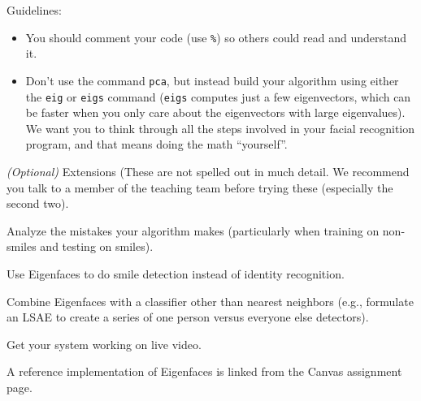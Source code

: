 \begin{prob}
Guidelines:
\begin{itemize}
\item You should comment your code (use \texttt{\%}) so others could read and understand it.
\item Don't use the command \texttt{pca}, but instead build your algorithm using either the \texttt{eig} or \texttt{eigs} command (\texttt{eigs} computes just a few eigenvectors, which can be faster when you only care about the eigenvectors with large eigenvalues). We want you to think through all the steps involved in your facial recognition program, and that means doing the math ``yourself''.
\end{itemize}
\emph{(Optional)} Extensions (These are not spelled out in much detail.  We recommend you talk to a member of the teaching team before trying these (especially the second two).
\bi
\item Analyze the mistakes your algorithm makes (particularly when training on non-smiles and testing on smiles).
\item Use Eigenfaces to do smile detection instead of identity recognition.
\item Combine Eigenfaces with a classifier other than nearest neighbors (e.g., formulate an LSAE to create a series of one person versus everyone else detectors).
\item Get your system working on live video.
\ei
\end{prob}
\begin{sol}
A reference implementation of Eigenfaces is linked from the Canvas assignment page.
\end{sol}

\pagebreak
\shipoutAnswer

